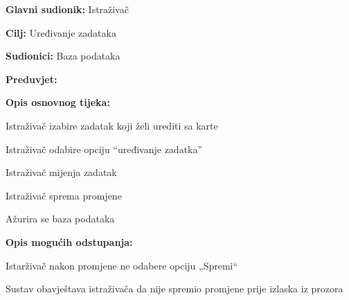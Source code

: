 					\begin{packed_item}
	
						\item \textbf{Glavni sudionik: } Istraživač
						\item  \textbf{Cilj:} Uređivanje zadataka
						\item  \textbf{Sudionici:} Baza podataka
						\item  \textbf{Preduvjet:}
						\item  \textbf{Opis osnovnog tijeka:}
						
						\item[] \begin{packed_enum}
	
							\item 	Istraživač izabire zadatak koji želi urediti sa karte
							\item Istraživač odabire opciju “uređivanje zadatka”
							\item 	Istraživač mijenja zadatak
							\item 	Istraživač sprema promjene
							\item 	Ažurira se baza podataka
							
						\end{packed_enum}

						\item  \textbf{Opis mogućih odstupanja:}
						
						\item[] \begin{packed_item}
	
							\item[4.a] 	Istarživač nakon promjene ne odabere opciju „Spremi“
							\item[] \begin{packed_enum}
								
								\item Sustav obavještava istraživača da nije spremio promjene prije izlaska iz prozora 
								
							\end{packed_enum}

						\end{packed_item}

					\end{packed_item}%
